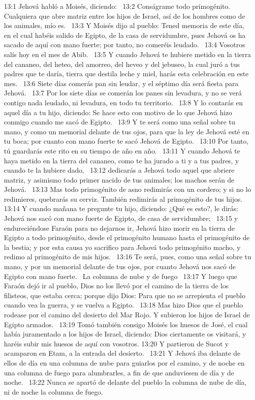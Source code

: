13:1 Jehová habló a Moisés, diciendo:  
13:2 Conságrame todo primogénito. Cualquiera que abre matriz entre los hijos de Israel, así de los hombres como de los animales, mío es.  
13:3 Y Moisés dijo al pueblo: Tened memoria de este día, en el cual habéis salido de Egipto, de la casa de servidumbre, pues Jehová os ha sacado de aquí con mano fuerte; por tanto, no comeréis leudado.  
13:4 Vosotros salís hoy en el mes de Abib.  
13:5 Y cuando Jehová te hubiere metido en la tierra del cananeo, del heteo, del amorreo, del heveo y del jebuseo, la cual juró a tus padres que te daría, tierra que destila leche y miel, harás esta celebración en este mes.  
13:6 Siete días comerás pan sin leudar, y el séptimo día será fiesta para Jehová.  
13:7 Por los siete días se comerán los panes sin levadura, y no se verá contigo nada leudado, ni levadura, en todo tu territorio.  
13:8 Y lo contarás en aquel día a tu hijo, diciendo: Se hace esto con motivo de lo que Jehová hizo conmigo cuando me sacó de Egipto.  
13:9 Y te será como una señal sobre tu mano, y como un memorial delante de tus ojos, para que la ley de Jehová esté en tu boca; por cuanto con mano fuerte te sacó Jehová de Egipto.  
13:10 Por tanto, tú guardarás este rito en su tiempo de año en año.  
13:11 Y cuando Jehová te haya metido en la tierra del cananeo, como te ha jurado a ti y a tus padres, y cuando te la hubiere dado,  
13:12 dedicarás a Jehová todo aquel que abriere matriz, y asimismo todo primer nacido de tus animales; los machos serán de Jehová.  
13:13 Mas todo primogénito de asno redimirás con un cordero; y si no lo redimieres, quebrarás su cerviz. También redimirás al primogénito de tus hijos.  
13:14 Y cuando mañana te pregunte tu hijo, diciendo: ¿Qué es esto?, le dirás: Jehová nos sacó con mano fuerte de Egipto, de casa de servidumbre;  
13:15 y endureciéndose Faraón para no dejarnos ir, Jehová hizo morir en la tierra de Egipto a todo primogénito, desde el primogénito humano hasta el primogénito de la bestia; y por esta causa yo sacrifico para Jehová todo primogénito macho, y redimo al primogénito de mis hijos.  
13:16 Te será, pues, como una señal sobre tu mano, y por un memorial delante de tus ojos, por cuanto Jehová nos sacó de Egipto con mano fuerte.  
La columna de nube y de fuego  
13:17 Y luego que Faraón dejó ir al pueblo, Dios no los llevó por el camino de la tierra de los filisteos, que estaba cerca; porque dijo Dios: Para que no se arrepienta el pueblo cuando vea la guerra, y se vuelva a Egipto.  
13:18 Mas hizo Dios que el pueblo rodease por el camino del desierto del Mar Rojo. Y subieron los hijos de Israel de Egipto armados.  
13:19 Tomó también consigo Moisés los huesos de José, el cual había juramentado a los hijos de Israel, diciendo: Dios ciertamente os visitará, y haréis subir mis huesos de aquí con vosotros. 
13:20 Y partieron de Sucot y acamparon en Etam, a la entrada del desierto.  
13:21 Y Jehová iba delante de ellos de día en una columna de nube para guiarlos por el camino, y de noche en una columna de fuego para alumbrarles, a fin de que anduviesen de día y de noche.  
13:22 Nunca se apartó de delante del pueblo la columna de nube de día, ni de noche la columna de fuego.  
